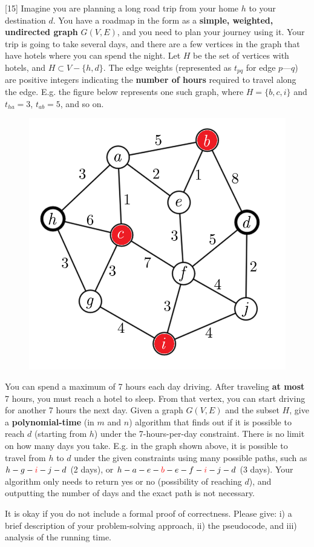 \documentclass[addpoints]{exam}
\def\mysolution#1{}    %
\begin{document}
\begin{questions}
[15]
Imagine you are planning a long road trip from your home $h$ to your destination $d$. You have a roadmap in the form as a \textbf{simple, weighted, undirected graph} $G(V,E)$, and you need to plan your journey using it. Your trip is going to take several days, and there are a few vertices in the graph that have hotels where you can spend the night. Let $H$ be the set of vertices with hotels, and $H \subset V-\{h,d\}$. The edge weights (represented as $t_{pq}$ for edge $p$---$q$) are positive integers indicating the \textbf{number of hours} required to travel along the edge. E.g. the figure below represents one such graph, where $H=\{b,c,i\}$ and $t_{ha}=3$, $t_{ab}=5$, and so on.

\begin{figure}[h!]
    \centering
    \includegraphics[width=0.35\linewidth]{hotels.png}
\end{figure}

You can spend a maximum of 7 hours each day driving. After traveling \textbf{at most} 7 hours, you must reach a hotel to sleep. From that vertex, you can start driving for another 7 hours the next day. Given a graph $G(V,E)$ and the subset $H$, give a \textbf{polynomial-time} (in $m$ and $n$) algorithm that finds out if it is possible to reach $d$ (starting from $h$) under the 7-hours-per-day constraint. There is no limit on how many days you take. E.g. in the graph shown above, it is possible to travel from $h$ to $d$ under the given constraints using many possible paths, such as $h-g-\textcolor{red}{i}-j-d$ (2 days), or $h-a-e-\textcolor{red}{b}-e-f-\textcolor{red}{i}-j-d$ (3 days). Your algorithm only needs to return yes or no (possibility of reaching $d$), and outputting the number of days and the exact path is not necessary.

It is okay if you do not include a formal proof of correctness. Please give: i) a brief description of your problem-solving approach, ii) the pseudocode, and iii) analysis of the running time. 

\mysolution{

}


\end{questions}
\end{document}
